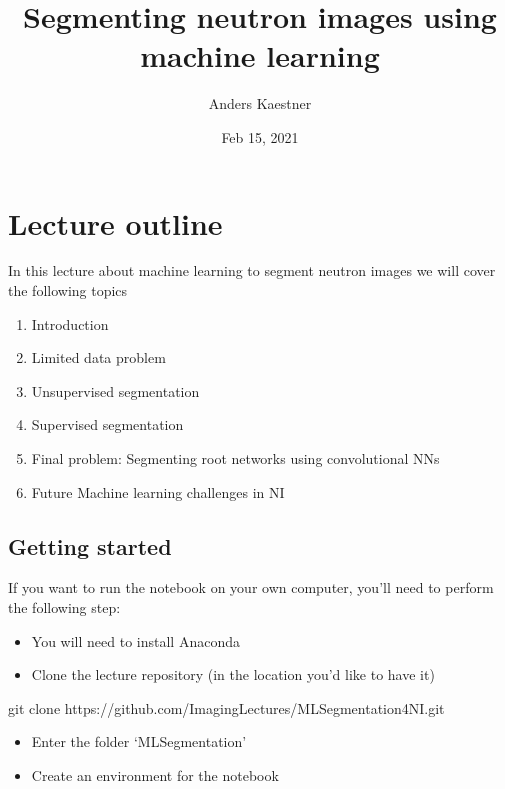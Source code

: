 \documentclass[letterpaper,10pt,english]{sphinxmanual}
\title{Segmenting neutron images using machine learning}
\date{Feb 15, 2021}
\author{Anders Kaestner}
\begin{document}
\pagestyle{empty}
\sphinxmaketitle
\pagestyle{plain}
\sphinxtableofcontents
\pagestyle{normal}
\label{\detokenize{ML4NeutronImageSegmentation::doc}}





\chapter{Lecture outline}
\label{\detokenize{ML4NeutronImageSegmentation:lecture-outline}}
In this lecture about machine learning to segment neutron images we will cover the following topics
\begin{enumerate}
%
\item {} 
Introduction

\item {} 
Limited data problem

\item {} 
Unsupervised segmentation

\item {} 
Supervised segmentation

\item {} 
Final problem: Segmenting root networks using convolutional NNs

\item {} 
Future Machine learning challenges in NI

\end{enumerate}


\section{Getting started}
\label{\detokenize{ML4NeutronImageSegmentation:getting-started}}
If you want to run the notebook on your own computer, you’ll need to perform the following step:
\begin{itemize}
\item {} 
You will need to install Anaconda

\item {} 
Clone the lecture repository (in the location you’d like to have it)

\end{itemize}

\begin{sphinxVerbatim}[commandchars=\\\{\}]
git clone https://github.com/ImagingLectures/MLSegmentation4NI.git
\end{sphinxVerbatim}
\begin{itemize}
\item {} 
Enter the folder ‘MLSegmentation’

\item {} 
Create an environment for the notebook

\end{itemize}
\end{document}
